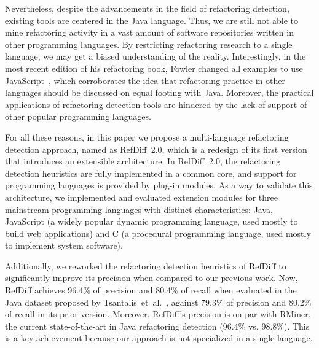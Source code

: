 Nevertheless, despite the advancements in the field of refactoring detection, existing tools are centered in the Java language.
Thus, we are still not able to mine refactoring activity in a vast amount of software repositories written in other programming languages.
By restricting refactoring research to a single language, we may get a biased understanding of the reality.
Interestingly, in the most recent edition of his refactoring book, Fowler changed all examples to use JavaScript~\cite{fowler2018refactoring}, which corroborates the idea that refactoring practice in other languages should be discussed on equal footing with Java.
Moreover, the practical applications of refactoring detection tools are hindered by the lack of support of other popular programming languages.

For all these reasons, in this paper we propose a multi-language refactoring detection approach, named as RefDiff~2.0, which is a redesign of its first version that introduces an extensible architecture.
In RefDiff~2.0, the refactoring detection heuristics are fully implemented in a common core, and support for programming languages is provided by plug-in modules.
As a way to validate this architecture, we implemented and evaluated extension modules for three mainstream programming languages with distinct characteristics: Java, JavaScript (a widely popular dynamic programming language, used mostly to build web applications) and C (a procedural programming language, used mostly to implement system software).

Additionally, we reworked the refactoring detection heuristics of RefDiff to significantly improve its precision when compared to our previous work.
Now, RefDiff achieves 96.4\% of precision and 80.4\% of recall when evaluated in the Java dataset proposed by Tsantalis~et~al.~\cite{tsantalis2018rminer}, against 79.3\% of precision and 80.2\% of recall in its prior version.
Moreover, RefDiff's precision is on par with RMiner, the current state-of-the-art in Java refactoring detection (96.4\% vs. 98.8\%).
This is a key achievement because our approach is not specialized in a single language.

